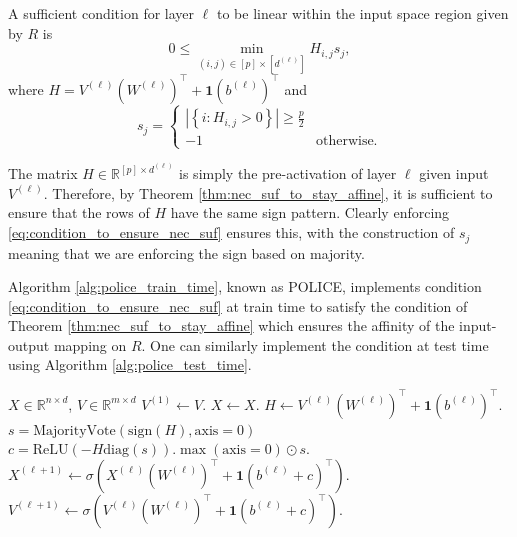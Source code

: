 \begin{proposition}
    A sufficient condition for layer $\ell$ to be linear within the input space region given by $R$ is
    \begin{equation}\label{eq:condition_to_ensure_nec_suf}
        0\leq\min_{(i,j)\in[p]\times\left[d^{(\ell)}\right]}H_{i,j}s_j,
    \end{equation}
    where $H=V^{(\ell)}\left(W^{(\ell)}\right)^\top+\mathbf{1}\left(b^{(\ell)}\right)^\top$ and $$s_j=\begin{cases}\left\vert\left\{i:H_{i,j}>0\right\}\right\vert\geq\frac{p}{2}\\-1&\text{otherwise.}\end{cases}$$
\end{proposition}

\begin{tproof}
    The matrix $H\in\mathbb{R}^{[p]\times d^{(\ell)}}$ is simply the pre-activation of layer $\ell$ given input $V^{(\ell)}$. Therefore, by Theorem \ref{thm:nec_suf_to_stay_affine}, it is sufficient to ensure that the rows of $H$ have the same sign pattern. Clearly enforcing \eqref{eq:condition_to_ensure_nec_suf} ensures this, with the construction of $s_j$ meaning that we are enforcing the sign based on majority.
\end{tproof}

Algorithm \ref{alg:police_train_time}, known as POLICE, implements condition \eqref{eq:condition_to_ensure_nec_suf} at train time to satisfy the condition of Theorem \ref{thm:nec_suf_to_stay_affine} which ensures the affinity of the input-output mapping on $R$. One can similarly implement the condition at test time using Algorithm \ref{alg:police_test_time}.

\begin{algorithm}
\caption{Provably Optimal Linear Constraint Enforcement. Train time.}\label{alg:police_train_time}
\begin{algorithmic}
\Require $X\in\mathbb{R}^{n\times d}$, $V\in\mathbb{R}^{m\times d}$
\State $V^{(1)}\leftarrow V$.
\State $X\leftarrow X$.
\State $H\leftarrow V^{(\ell)}\left(W^{(\ell)}\right)^\top+\mathbf{1}\left(b^{(\ell)}\right)^\top$.
\State $s=\text{MajorityVote}\left(\mathrm{sign}(H),\text{axis}=0\right)$
\State $c=\mathrm{ReLU}\left(-H\mathrm{diag}(s)\right).\max(\text{axis}=0)\odot s$.
\State $X^{(\ell+1)}\leftarrow\sigma\left(X^{(\ell)}\left(W^{(\ell)}\right)^\top+\mathbf{1}\left(b^{(\ell)}+c\right)^\top\right)$.
\State $V^{(\ell+1)}\leftarrow\sigma\left(V^{(\ell)}\left(W^{(\ell)}\right)^\top+\mathbf{1}\left(b^{(\ell)}+c\right)^\top\right)$.
\EndFor
\end{algorithmic}
\end{algorithm}

